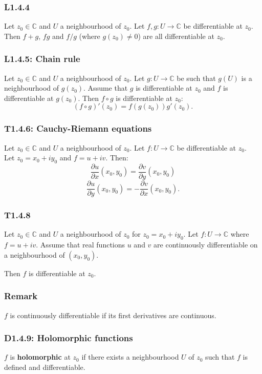 \documentclass{article}
\begin{document}
\begin{multicols*}{3}
\subsubsection*{L1.4.4}
Let $z_0\in\mathbb{C}$ and $U$ a neighbourhood of $z_0$.
Let $f,g:U\rightarrow\mathbb{C}$ be differentiable at $z_0$.
Then $f+g$, $fg$ and $f/g$ (where $g(z_0)\neq0$)
are all differentiable at $z_0$.

\subsubsection*{L1.4.5: Chain rule}
Let $z_0\in\mathbb{C}$ and $U$ a neighbourhood of $z_0$.
Let $g:U\rightarrow\mathbb{C}$ be such that $g(U)$ is a neighbourhood
of $g(z_0)$. Assume that $g$ is differentiable at $z_0$
and $f$ is differentiable at $g(z_0)$. Then $f\circ g$
is differentiable at $z_0$:
$$(f\circ g)'(z_0)=f(g(z_0))g'(z_0).$$

\subsubsection*{T1.4.6: Cauchy-Riemann equations}
Let $z_0\in\mathbb{C}$ and $U$ a neighbourhood of $z_0$.
Let $f:U\rightarrow\mathbb{C}$ be differentiable at $z_0$. \\
Let $z_0=x_0+i y_0$ and $f=u+iv$. Then:
$$\frac{\partial u}{\partial x}(x_0,y_0)
=\frac{\partial v}{\partial y}(x_0,y_0)$$
$$\frac{\partial u}{\partial y}(x_0,y_0)
=-\frac{\partial v}{\partial x}(x_0,y_0).$$

\subsubsection*{T1.4.8}
Let $z_0\in\mathbb{C}$ and $U$ a neighbourhood of $z_0$
for $z_0=x_0+i y_0$. Let $f:U\rightarrow\mathbb{C}$ where $f=u+iv$.
Assume that real functions $u$ and $v$ are
continuously differentiable on a neighbourhood of $(x_0,y_0)$.

Then $f$ is differentiable at $z_0$.

\subsubsection*{Remark}
$f$ is continuously differentiable if its first derivatives
are continuous.

\subsubsection*{D1.4.9: Holomorphic functions}
$f$ is \textbf{holomorphic} at $z_0$ if there exists a neighbourhood
$U$ of $z_0$ such that $f$ is defined and differentiable.


\end{multicols*}
\end{document}
